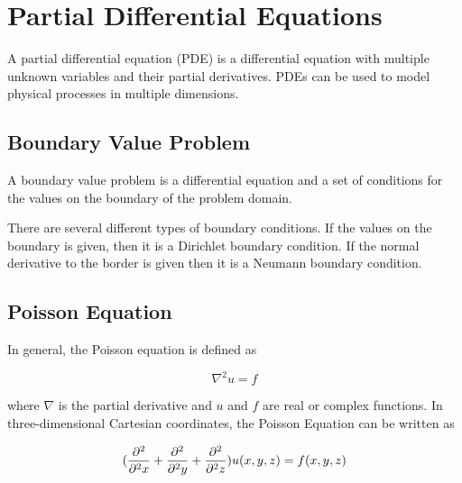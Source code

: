\section{Partial Differential Equations}

A partial differential equation (PDE) is a differential equation with multiple 
unknown variables and their partial derivatives. PDEs can be used to model physical 
processes in multiple dimensions. 

\subsection{Boundary Value Problem}

A boundary value problem is a differential equation and a set of conditions for
the values on the boundary of the problem domain.

There are several different types of boundary conditions. If the values on the
boundary is given, then it is a Dirichlet boundary condition. If the normal
derivative to the border is given then it is a Neumann boundary
condition\cite{Kreyszig}.

\subsection{Poisson Equation}

In general, the Poisson equation is defined as 

$$\nabla^2 u = f$$

where $\nabla$ is the partial derivative and $u$ and $f$ are real or complex 
functions. In three-dimensional Cartesian coordinates, the Poisson Equation can 
be written as 

$$(\frac{\partial^2}{\partial^2 x} + \frac{\partial^2}{\partial^2 y} + \frac{\partial^2}{\partial^2 z}) u (x, y, z) = f(x, y, z)$$
